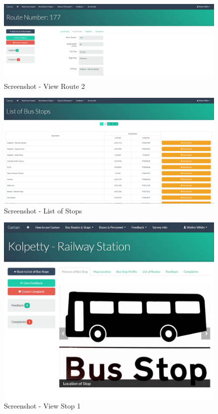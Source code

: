 \begin {figure} [h!]
\centering
\includegraphics[scale=0.2]{viewRoute2}
\caption [Screenshot - View Route 2] {Screenshot - View Route 2}
\label {image-viewRoute2}
\end {figure}


\begin {figure} [h!]
\centering
\includegraphics[scale=0.2]{listStops}
\caption [Screenshot - List of Stops] {Screenshot - List of Stops}
\label {image-listStops}
\end {figure}


\begin {figure} [h!]
\centering
\includegraphics[scale=0.2]{viewStop1}
\caption [Screenshot - View Stop 1] {Screenshot - View Stop 1}
\label {image-viewStop1}
\end {figure}


